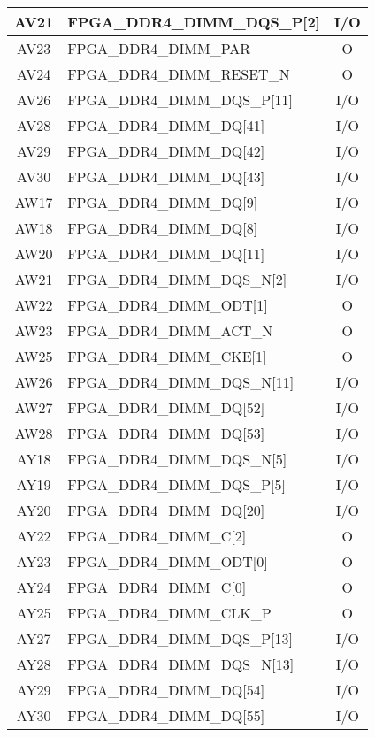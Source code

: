 \begin{longtable}[l]{| c | l | c |}
  AV21 & FPGA\_DDR4\_DIMM\_DQS\_P[2]  & I/O \\ \hline
  AV23 & FPGA\_DDR4\_DIMM\_PAR        & O   \\ \hline
  AV24 & FPGA\_DDR4\_DIMM\_RESET\_N   & O   \\ \hline
  AV26 & FPGA\_DDR4\_DIMM\_DQS\_P[11] & I/O \\ \hline
  AV28 & FPGA\_DDR4\_DIMM\_DQ[41]     & I/O \\ \hline
  AV29 & FPGA\_DDR4\_DIMM\_DQ[42]     & I/O \\ \hline
  AV30 & FPGA\_DDR4\_DIMM\_DQ[43]     & I/O \\ \hline
  AW17 & FPGA\_DDR4\_DIMM\_DQ[9]      & I/O \\ \hline
  AW18 & FPGA\_DDR4\_DIMM\_DQ[8]      & I/O \\ \hline
  AW20 & FPGA\_DDR4\_DIMM\_DQ[11]     & I/O \\ \hline
  AW21 & FPGA\_DDR4\_DIMM\_DQS\_N[2]  & I/O \\ \hline
  AW22 & FPGA\_DDR4\_DIMM\_ODT[1]     & O   \\ \hline
  AW23 & FPGA\_DDR4\_DIMM\_ACT\_N     & O   \\ \hline
  AW25 & FPGA\_DDR4\_DIMM\_CKE[1]     & O   \\ \hline
  AW26 & FPGA\_DDR4\_DIMM\_DQS\_N[11] & I/O \\ \hline
  AW27 & FPGA\_DDR4\_DIMM\_DQ[52]     & I/O \\ \hline
  AW28 & FPGA\_DDR4\_DIMM\_DQ[53]     & I/O \\ \hline
  AY18 & FPGA\_DDR4\_DIMM\_DQS\_N[5]  & I/O \\ \hline
  AY19 & FPGA\_DDR4\_DIMM\_DQS\_P[5]  & I/O \\ \hline
  AY20 & FPGA\_DDR4\_DIMM\_DQ[20]     & I/O \\ \hline
  AY22 & FPGA\_DDR4\_DIMM\_C[2]       & O   \\ \hline
  AY23 & FPGA\_DDR4\_DIMM\_ODT[0]     & O   \\ \hline
  AY24 & FPGA\_DDR4\_DIMM\_C[0]       & O   \\ \hline
  AY25 & FPGA\_DDR4\_DIMM\_CLK\_P     & O   \\ \hline
  AY27 & FPGA\_DDR4\_DIMM\_DQS\_P[13] & I/O \\ \hline
  AY28 & FPGA\_DDR4\_DIMM\_DQS\_N[13] & I/O \\ \hline
  AY29 & FPGA\_DDR4\_DIMM\_DQ[54]     & I/O \\ \hline
  AY30 & FPGA\_DDR4\_DIMM\_DQ[55]     & I/O \\ \hline

\end{longtable}
